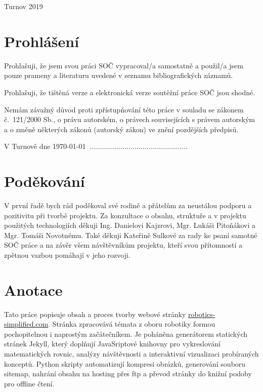 \documentclass[a4paper, 12pt]{article}
\begin{document}
  \fontsize{12}{14.4} \selectfont
  Turnov 2019

  \vspace{4em}

  \newpage

  \section*{\normalfont\textbf{Prohlášení}}
  Prohlašuji, že jsem svou práci SOČ vypracoval/a samostatně a použil/a jsem pouze prameny a literaturu uvedené v seznamu bibliografických záznamů.

  Prohlašuji, že tištěná verze a elektronická verze soutěžní práce SOČ jsou shodné.

  Nemám závažný důvod proti zpřístupňování této práce v souladu se zákonem č.~121/2000 Sb., o právu autorském, o právech souvisejících s právem autorským a o změně některých zákonů (autorský zákon) ve znění pozdějších předpisů.

  \qquad

  V Turnově dne \today \, ..................................................\\%

  \newpage

  \section*{\normalfont\textbf{Poděkování}}
  V první řadě bych rád poděkoval své rodině a přátelům za neustálou podporu a pozitivitu při tvorbě projektu. Za konzultace o obsahu, struktuře a v projektu použitých technologiích děkuji Ing. Danielovi Kajzrovi, Mgr. Lukáši Pitoňákovi a Mgr. Tomáši Novotnému. Také děkuji Kateřině Sulkové za rady ke psaní samotné SOČ práce a na závěr všem návštěvníkům projektu, kteří svou přítomností a zpětnou vazbou pomáhají v jeho rozvoji.

  \newpage

  \section*{\normalfont\textbf{Anotace}}
  Tato práce popisuje obsah a proces tvorby webové stránky \url{robotics-simplified.com}. Stránka zpracovává témata z oboru robotiky formou pochopitelnou i naprostým začátečníkem. Je poháněna generátorem statických stránek Jekyll, který doplňují JavaSriptové knihovny pro vykreslování matematických rovnic, analýzy návštěvnosti a interaktivní vizualizaci probíraných konceptů. Python skripty automatizují kompresi obrázků, generování souboru sitemap, nahrání obsahu na hosting přes \acrshort{ftp} a převod stránky do knižní podoby pro offline čtení.
\end{document}
